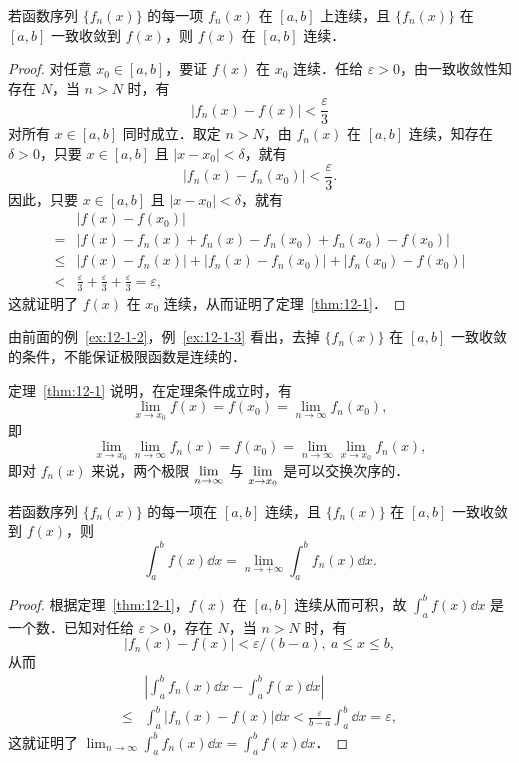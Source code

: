 \begin{theorem}\label{thm:12-1}
若函数序列 $\{f_{n}(x)\}$ 的每一项 $f_{n}(x)$ 在 $[a,b]$ 上连续，且 $\{f_{n}(x)\}$ 在 $[a,b]$ 一致收敛到 $f(x)$，则 $f(x)$ 在 $[a,b]$ 连续．
\end{theorem}

\begin{proof}
对任意 $x_{0}\in[a,b]$，要证 $f(x)$ 在 $x_{0}$ 连续．任给 $\varepsilon>0$，由一致收敛性知存在 $N$，当 $n>N$ 时，有
\[
\left|f_{n}(x)-f(x)\right|<\frac{\varepsilon}{3}
\]
对所有 $x\in[a,b]$ 同时成立．取定 $n>N$，由 $f_{n}(x)$ 在 $[a,b]$ 连续，知存在 $\delta>0$，只要 $x\in[a,b]$ 且 $\left|x-x_{0}\right|<\delta$，就有
\[
\left|f_{n}(x)-f_{n}(x_{0})\right|<\frac{\varepsilon}{3}.
\]
因此，只要 $x\in[a,b]$ 且 $\left|x-x_{0}\right|<\delta$，就有
\[
\begin{aligned}
&\left|f(x)-f(x_{0})\right|\\
={}&\left|f(x)-f_{n}(x)+f_{n}(x)-f_{n}(x_{0})+f_{n}(x_{0})-f(x_{0})\right|\\
\leqslant{}&\left|f(x)-f_{n}(x)\right|+\left|f_{n}(x)-f_{n}(x_{0})\right|+\left|f_{n}(x_{0})-f(x_{0})\right|\\
<{}&\frac{\varepsilon}{3}+\frac{\varepsilon}{3}+\frac{\varepsilon}{3}=\varepsilon,
\end{aligned}
\]
这就证明了 $f(x)$ 在 $x_{0}$ 连续，从而证明了定理~\ref{thm:12-1}．
\end{proof}

由前面的例~\ref{ex:12-1-2}，例~\ref{ex:12-1-3} 看出，去掉 $\{f_{n}(x)\}$ 在 $[a,b]$ 一致收敛的条件，不能保证极限函数是连续的．

定理~\ref{thm:12-1} 说明，在定理条件成立时，有
\[
\lim_{x\to x_{0}}f(x)=f(x_{0})=\lim_{n\to\infty}f_{n}(x_{0}),
\]
即
\[
\lim_{x\to x_{0}}\lim_{n\to\infty}f_{n}(x)=f(x_{0})=\lim_{n\to\infty}\lim_{x\to x_{0}}f_{n}(x),
\]
即对 $f_{n}(x)$ 来说，两个极限 $\mathop{\mathrm{lim}}\limits_{n\to\infty}$ 与 $\mathop{\mathrm{lim}}\limits_{x\to x_{0}}$ 是可以交换次序的．

\begin{theorem}\label{thm:12-2}
若函数序列 $\{f_{n}(x)\}$ 的每一项在 $[a,b]$ 连续，且 $\{f_{n}(x)\}$ 在 $[a,b]$ 一致收敛到 $f(x)$，则
\[
\int_{a}^{b}f(x)\dd x=\lim_{n\to+\infty}\int_{a}^{b}f_{n}(x)\dd x.
\]
\end{theorem}

\begin{proof}
根据定理~\ref{thm:12-1}，$f(x)$ 在 $[a,b]$ 连续从而可积，故 $\displaystyle\int_{a}^{b}f(x)\dd x$ 是一个数．已知对任给 $\varepsilon>0$，存在 $N$，当 $n>N$ 时，有
\[
\left|f_{n}(x)-f(x)\right|<\varepsilon/\left(b-a\right),\ a\leqslant x\leqslant b,
\]
从而
\[
\begin{aligned}
&\left|\int_{a}^{b}f_{n}(x)\dd x-\int_{a}^{b}f(x)\dd x\right|\\
\leqslant{}&\int_{a}^{b}\left|f_{n}(x)-f(x)\right|\dd x
<\frac{\varepsilon}{b-a}\int_{a}^{b}\dd x=\varepsilon,
\end{aligned}
\]
这就证明了 $\displaystyle\lim_{n\to\infty}\int_{a}^{b}f_{n}(x)\dd x=\int_{a}^{b}f(x)\dd x$．
\end{proof}

